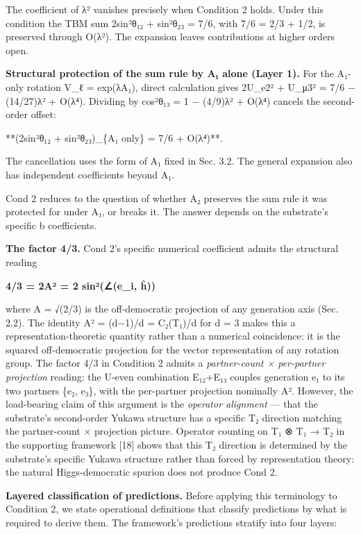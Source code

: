 \documentclass[
]{article}
\begin{document}
The coefficient of λ² vanishes precisely when Condition 2 holds. Under
this condition the TBM sum 2sin²θ₁₂ + sin²θ₂₃ = 7/6, with 7/6 = 2/3 +
1/2, is preserved through O(λ²). The expansion leaves contributions at
higher orders open.

\textbf{Structural protection of the sum rule by A₁ alone (Layer 1).}
For the A₁-only rotation V\_ℓ = exp(λA₁), direct calculation gives
2\textbar U\_e2\textbar² + \textbar U\_μ3\textbar² = 7/6 − (14/27)λ² +
O(λ⁴). Dividing by cos²θ₁₃ = 1 − (4/9)λ² + O(λ⁴) cancels the
second-order offset:

**(2sin²θ₁₂ + sin²θ₂₃)\textbar\_\{A₁ only\} = 7/6 + O(λ⁴)**.

The cancellation uses the form of A₁ fixed in Sec. 3.2. The general
expansion also has independent coefficients beyond A₁.

Cond 2 reduces to the question of whether A₂ preserves the sum rule it
was protected for under A₁, or breaks it. The answer depends on the
substrate's specific b coefficients.

\textbf{The factor 4/3.} Cond 2's specific numerical coefficient admits
the structural reading

\textbf{4/3 = 2A² = 2 sin²(∠(e\_i, ĥ))}

where A = √(2/3) is the off-democratic projection of any generation axis
(Sec. 2.2). The identity A² = (d−1)/d = C₂(T₁)/d for d = 3 makes this a
representation-theoretic quantity rather than a numerical coincidence:
it is the squared off-democratic projection for the vector
representation of any rotation group. The factor 4/3 in Condition 2
admits a \emph{partner-count × per-partner projection} reading: the
U-even combination E₁₂+E₁₃ couples generation e₁ to its two partners
\{e₂, e₃\}, with the per-partner projection nominally A². However, the
load-bearing claim of this argument is the \emph{operator alignment} ---
that the substrate's second-order Yukawa structure has a specific T₂
direction matching the partner-count × projection picture. Operator
counting on T₁ ⊗ T₁ → T₂ in the supporting framework {[}18{]} shows that
this T₂ direction is determined by the substrate's specific Yukawa
structure rather than forced by representation theory: the natural
Higgs-democratic spurion does not produce Cond 2.

\textbf{Layered classification of predictions.} Before applying this
terminology to Condition 2, we state operational definitions that
classify predictions by what is required to derive them. The framework's
predictions stratify into four layers:
\end{document}
